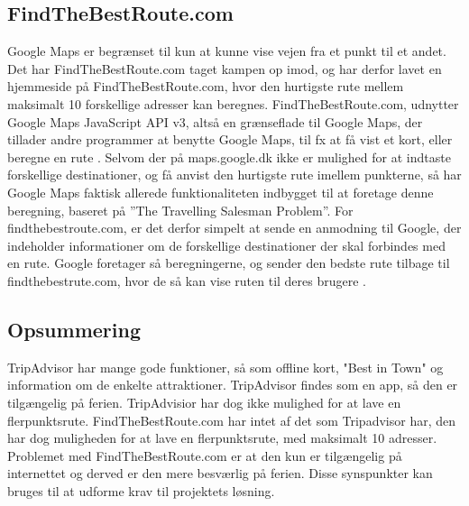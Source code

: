 \subsection{FindTheBestRoute.com}
Google Maps er begrænset til kun at kunne vise vejen fra et punkt til et andet. Det har FindTheBestRoute.com taget kampen op imod, og har derfor lavet en hjemmeside på FindTheBestRoute.com, hvor den hurtigste rute mellem maksimalt 10 forskellige adresser kan beregnes. FindTheBestRoute.com, udnytter Google Maps JavaScript API v3, altså en grænseflade til Google Maps, der tillader andre programmer at benytte Google Maps, til fx at få vist et kort, eller beregne en rute \citep{ftbr}.\newline
Selvom der på maps.google.dk ikke er mulighed for at indtaste forskellige destinationer, og få anvist den hurtigste rute imellem punkterne, så har Google Maps faktisk allerede funktionaliteten indbygget til at foretage denne beregning, baseret på ”The Travelling Salesman Problem”.\newline
For findthebestroute.com, er det derfor simpelt at sende en anmodning til Google, der indeholder informationer om de forskellige destinationer der skal forbindes med en rute. Google foretager så beregningerne, og sender den bedste rute tilbage til findthebestrute.com, hvor de så kan vise ruten til deres brugere \citep{googleapi}. \newline
\subsection{Opsummering}
TripAdvisor har mange gode funktioner, så som offline kort, "Best in Town" og information om de enkelte attraktioner. TripAdvisor findes som en app, så den er tilgængelig på ferien. TripAdvisior har dog ikke mulighed for at lave en flerpunktsrute. \newline
FindTheBestRoute.com har intet af det som Tripadvisor har, den har dog muligheden for at lave en flerpunktsrute, med maksimalt 10 adresser. Problemet med FindTheBestRoute.com er at den kun er tilgængelig på internettet og derved er den  mere besværlig på ferien.\newline
Disse synspunkter kan bruges til at udforme krav til projektets løsning. 